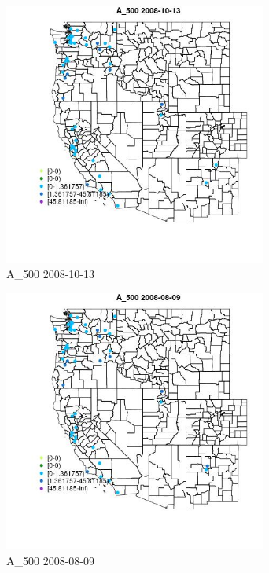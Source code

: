 \begin{figure} 
\centering  
\includegraphics[width=0.77\textwidth]{Code_Outputs/Report_ML_input_PM25_Step4_part_e_de_duplicated_aves_MapObsA_5002008-10-13.jpg} 
\caption{\label{fig:Report_ML_input_PM25_Step4_part_e_de_duplicated_avesMapObsA_5002008-10-13}A_500 2008-10-13} 
\end{figure} 
 

\begin{figure} 
\centering  
\includegraphics[width=0.77\textwidth]{Code_Outputs/Report_ML_input_PM25_Step4_part_e_de_duplicated_aves_MapObsA_5002008-08-09.jpg} 
\caption{\label{fig:Report_ML_input_PM25_Step4_part_e_de_duplicated_avesMapObsA_5002008-08-09}A_500 2008-08-09} 
\end{figure} 
 


